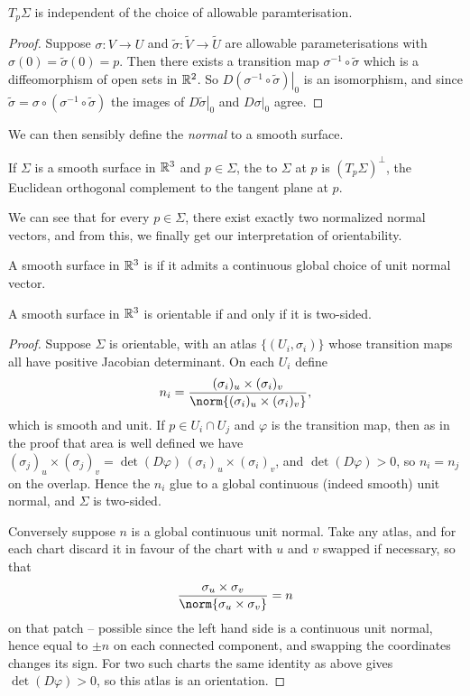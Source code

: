 \documentclass[a4paper]{scrartcl}
\begin{document}
\begin{lemma}
$T_p\Sigma$ is independent of the choice of allowable paramterisation.
\end{lemma}
\begin{proof}
    Suppose $\sigma: V \rightarrow U$ and $\tilde \sigma : \tilde V \rightarrow \tilde U$ are allowable parameterisations with $\sigma(0) = \tilde \sigma(0) = p$. Then there exists a transition map $\sigma^{-1} \circ \tilde \sigma$ which is a diffeomorphism of open sets in $\mathbb{R}^2$. So $D\left.(\sigma^{-1} \circ \tilde \sigma) \right|_0$ is an isomorphism, and since $\tilde \sigma = \sigma \circ (\sigma^{-1} \circ \tilde \sigma)$ the images of $\left.D \tilde\sigma\right|_0$ and $\left.D \sigma\right|_0$ agree.
\end{proof}

We can then sensibly define the \emph{normal} to a smooth surface.

\begin{definition}
    If $\Sigma$ is a smooth surface in $\mathbb{R}^3$ and $p \in \Sigma$, the  to $\Sigma$ at $p$ is $(T_p \Sigma)^\perp$, the Euclidean orthogonal complement to the tangent plane at $p$.
\end{definition}

We can see that for every $p \in \Sigma$, there exist exactly two normalized normal vectors, and from this, we finally get our interpretation of orientability.

\begin{definition}
    A smooth surface in $\mathbb{R}^3$ is  if it admits a continuous global choice of unit normal vector.
\end{definition}

\begin{lemma}
    A smooth surface in $\mathbb{R}^3$ is orientable if and only if it is two-sided.
\end{lemma}
\begin{proof}
    Suppose $\Sigma$ is orientable, with an atlas $\{(U_i, \sigma_i)\}$ whose transition maps all have positive Jacobian determinant. On each $U_i$ define
    $$
    n_i = \frac{(\sigma_i)_u \times (\sigma_i)_v}{\norm{(\sigma_i)_u \times (\sigma_i)_v}},
    $$
    which is smooth and unit. If $p \in U_i \cap U_j$ and $\varphi$ is the transition map, then as in the proof that area is well defined we have $(\sigma_j)_u \times (\sigma_j)_v = \det(D\varphi)\,(\sigma_i)_u\times(\sigma_i)_v$, and $\det(D\varphi) > 0$, so $n_i = n_j$ on the overlap. Hence the $n_i$ glue to a global continuous (indeed smooth) unit normal, and $\Sigma$ is two-sided.

    Conversely suppose $n$ is a global continuous unit normal. Take any atlas, and for each chart discard it in favour of the chart with $u$ and $v$ swapped if necessary, so that
    $$
    \frac{\sigma_u\times\sigma_v}{\norm{\sigma_u\times\sigma_v}} = n
    $$
    on that patch -- possible since the left hand side is a continuous unit normal, hence equal to $\pm n$ on each connected component, and swapping the coordinates changes its sign. For two such charts the same identity as above gives $\det(D\varphi) > 0$, so this atlas is an orientation.
\end{proof}
\end{document}
